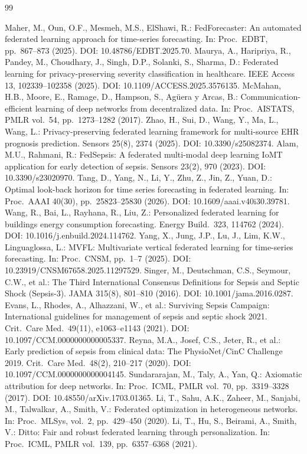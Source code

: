 \documentclass{llncs}
\renewenvironment{thebibliography}[1]{%
  \begin{origthebibliography}{#1}%
    \setlength{\itemsep}{-2.6pt plus 0.2pt}%
    \setlength{\parskip}{0pt}%
    \footnotesize\sloppy
}{%
  \end{origthebibliography}%
}
\begin{document}
\begin{thebibliography}{99}
 Maher, M., Oun, O.F., Mesmeh, M.S., ElShawi, R.: FedForecaster: An automated federated learning approach for time-series forecasting. In: Proc.\ EDBT, pp.\ 867--873 (2025). DOI: 10.48786/EDBT.2025.70.
 Maurya, A., Haripriya, R., Pandey, M., Choudhary, J., Singh, D.P., Solanki, S., Sharma, D.: Federated learning for privacy-preserving severity classification in healthcare. IEEE Access 13, 102339--102358 (2025). DOI: 10.1109/ACCESS.2025.3576135.
 McMahan, H.B., Moore, E., Ramage, D., Hampson, S., Ag\"{u}era y Arcas, B.: Communication-efficient learning of deep networks from decentralized data. In: Proc.\ AISTATS, PMLR vol.\ 54, pp.\ 1273--1282 (2017).
 Zhao, H., Sui, D., Wang, Y., Ma, L., Wang, L.: Privacy-preserving federated learning framework for multi-source EHR prognosis prediction. Sensors 25(8), 2374 (2025). DOI: 10.3390/s25082374.
 Alam, M.U., Rahmani, R.: FedSepsis: A federated multi-modal deep learning IoMT application for early detection of sepsis. Sensors 23(2), 970 (2023). DOI: 10.3390/s23020970.
 Tang, D., Yang, N., Li, Y., Zhu, Z., Jin, Z., Yuan, D.: Optimal look-back horizon for time series forecasting in federated learning. In: Proc.\ AAAI 40(30), pp.\ 25823--25830 (2026). DOI: 10.1609/aaai.v40i30.39781.
 Wang, R., Bai, L., Rayhana, R., Liu, Z.: Personalized federated learning for buildings energy consumption forecasting. Energy Build.\ 323, 114762 (2024). DOI: 10.1016/j.enbuild.2024.114762.
 Yang, X., Jung, J.P., Lu, J., Lim, K.W., Linguaglossa, L.: MVFL: Multivariate vertical federated learning for time-series forecasting. In: Proc.\ CNSM, pp.\ 1--7 (2025). DOI: 10.23919/CNSM67658.2025.11297529.
 Singer, M., Deutschman, C.S., Seymour, C.W., et al.: The Third International Consensus Definitions for Sepsis and Septic Shock (Sepsis-3). JAMA 315(8), 801--810 (2016). DOI: 10.1001/jama.2016.0287.
 Evans, L., Rhodes, A., Alhazzani, W., et al.: Surviving Sepsis Campaign: International guidelines for management of sepsis and septic shock 2021. Crit.\ Care Med.\ 49(11), e1063--e1143 (2021). DOI: 10.1097/CCM.0000000000005337.
 Reyna, M.A., Josef, C.S., Jeter, R., et al.: Early prediction of sepsis from clinical data: The PhysioNet/CinC Challenge 2019. Crit.\ Care Med.\ 48(2), 210--217 (2020). DOI: 10.1097/CCM.0000000000004145.
 Sundararajan, M., Taly, A., Yan, Q.: Axiomatic attribution for deep networks. In: Proc.\ ICML, PMLR vol.\ 70, pp.\ 3319--3328 (2017). DOI: 10.48550/arXiv.1703.01365.
 Li, T., Sahu, A.K., Zaheer, M., Sanjabi, M., Talwalkar, A., Smith, V.: Federated optimization in heterogeneous networks. In: Proc.\ MLSys, vol.\ 2, pp.\ 429--450 (2020).
 Li, T., Hu, S., Beirami, A., Smith, V.: Ditto: Fair and robust federated learning through personalization. In: Proc.\ ICML, PMLR vol.\ 139, pp.\ 6357--6368 (2021).

\end{thebibliography}
\end{document}
